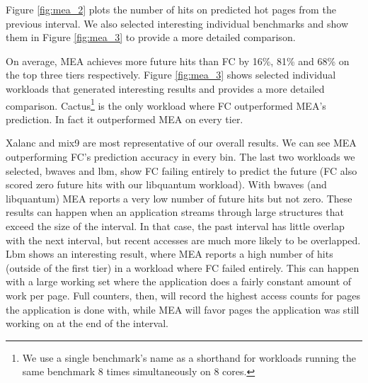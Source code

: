 Figure \ref{fig:mea_2} plots the number of hits on predicted hot pages from the previous interval. We also selected interesting individual benchmarks and show them in Figure \ref{fig:mea_3} to provide a more detailed comparison. 


On average, MEA achieves more future hits than FC by 16\%, 81\% and 68\% on the top three tiers respectively. Figure \ref{fig:mea_3} shows selected individual workloads that generated interesting results and provides a more detailed comparison. Cactus\footnote{We use a single benchmark's name as a shorthand for workloads running the same benchmark 8 times simultaneously on 8 cores.} is the only workload where FC outperformed MEA's prediction. In fact it outperformed MEA on every tier. 

Xalanc and mix9 are most representative of our overall
results. We can see MEA outperforming FC's prediction accuracy in every bin. 
The last two workloads we selected, bwaves and lbm, show FC failing entirely to predict the future (FC also scored zero future hits with our libquantum workload). With bwaves (and libquantum) MEA reports a very low number of future hits but not zero. These results can happen when an application streams through large structures
that exceed the size of the interval.  In that case, the past interval has 
little overlap with the next interval, but recent accesses are much more
likely to be overlapped.
Lbm shows an interesting result, where MEA reports 
a high number of hits (outside of the first tier) in a workload where 
FC failed entirely.  This can happen with a large working set where the 
application does a fairly constant amount of work per page.  Full counters,
then, will record the highest access counts for pages the application is done
with, while MEA will favor pages the application was still working on at the
end of the interval.

